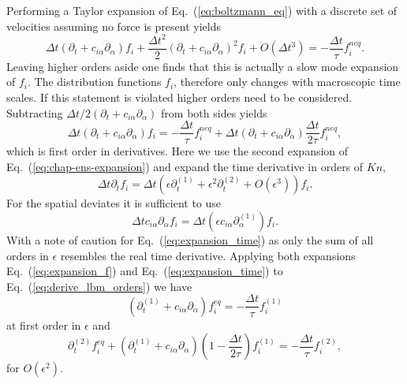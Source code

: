 Performing a Taylor expansion of Eq.~(\ref{eq:boltzmann_eq}) with a discrete set of velocities assuming no force is present yields~\cite{krugerLatticeBoltzmannMethod2017}
\begin{equation}\label{eq:Taylor_discret_boltzmann}
    \Delta t (\partial_t + c_{i\alpha}\partial_{\alpha})f_{i} + \frac{\Delta t^2}{2}(\partial_t + c_{i\alpha}\partial_{\alpha})^2 f_{i} + O(\Delta t^3) = -\frac{\Delta t}{\tau} f_{i}^{neq}.
\end{equation}
Leaving higher orders aside one finds that this is actually a slow mode expansion of $f_{i}$.
The distribution functions $f_{i}$, therefore only changes with macroscopic time scales. 
If this statement is violated higher orders need to be considered.
Subtracting $\Delta t/2 (\partial_t + c_{i\alpha}\partial_{\alpha})$ from both sides yields
\begin{equation}\label{eq:derive_lbm_orders}
    \Delta t (\partial_t + c_{i\alpha}\partial_{\alpha})f_{i} = -\frac{\Delta t}{\tau} f_{i}^{neq} + \Delta t (\partial_t + c_{i\alpha}\partial_{\alpha})\frac{\Delta t}{2\tau} f^{neq}_{i},
\end{equation}
which is first order in derivatives.
Here we use the second expansion of Eq.~(\ref{eq:chap-ens-expansion}) and expand the time derivative in orders of $Kn$,
\begin{equation}\label{eq:expansion_time}
    \Delta t \partial_t f_{i} = \Delta t (\epsilon\partial_t^{(1)} + \epsilon^2\partial_t^{(2)} + O(\epsilon^3)) f_{i}.
\end{equation}
For the spatial deviates it is sufficient to use
\begin{equation}\label{eq:expansion_space}
    \Delta t c_{i\alpha}\partial_{\alpha} f_{i} = \Delta t(\epsilon c_{i\alpha}\partial_{\alpha}^{(1)}) f_{i}.
\end{equation}
With a note of caution for Eq.~(\ref{eq:expansion_time}) as only the sum of all orders in $\epsilon$ resembles the real time derivative.
Applying both expansions Eq.~(\ref{eq:expansion_f}) and Eq.~(\ref{eq:expansion_time}) to Eq.~(\ref{eq:derive_lbm_orders}) we have
\begin{equation}\label{eq:first_order_esp}
    (\partial_t^{(1)} + c_{i\alpha}\partial_{\alpha}) f_{i}^{eq} = -\frac{\Delta t}{\tau} f_{i}^{(1)}
\end{equation}
at first order in $\epsilon$ and 
\begin{equation}\label{eq:sec_order_esp}
    \partial_t^{(2)} f_{i}^{eq} + (\partial_t^{(1)} + c_{i\alpha}\partial_{\alpha})\left(1 - \frac{\Delta t}{2\tau}\right) f_{i}^{(1)} = -\frac{\Delta t}{\tau} f_{i}^{(2)},
\end{equation}
for $O(\epsilon^2)$.

